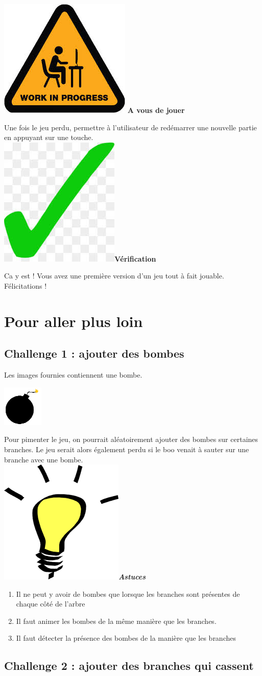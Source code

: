 \documentclass[french]{article}
\newcommand{\tips}{\includegraphics[scale=0.08]{tips}\textbf{\textit{Astuces\\}}}
\newcommand{\todo}{\includegraphics[scale=0.1]{work_in_progress}\textbf{ A vous de jouer\\} }
\newcommand{\result}{\includegraphics[scale=0.1]{green_tick}\textbf{Vérification\\}}
\begin{document}
\todo

Une fois le jeu perdu, permettre à l'utilisateur de redémarrer une nouvelle partie en appuyant sur une touche.\\

\result

Ca y est ! Vous avez une première version d'un jeu tout à fait jouable. Félicitations ! 

\section{Pour aller plus loin}

\subsection{Challenge 1 : ajouter des bombes}

Les images fournies contiennent une bombe. 

\begin{center}
	\includegraphics[scale=2]{bomb}
\end{center}

Pour pimenter le jeu, on pourrait aléatoirement ajouter des bombes sur certaines branches. Le jeu serait alors également perdu si le boo venait à sauter sur une branche avec une bombe.\\

\tips

\begin{enumerate}
	
	\item Il ne peut y avoir de bombes que lorsque les branches sont présentes de chaque côté de l'arbre\\
	
	\item Il faut animer les bombes de la même manière que les branches.\\
	
	\item Il faut détecter la présence des bombes de la manière que les branches\\
	
\end{enumerate}	

\subsection{Challenge 2 : ajouter des branches qui cassent}
\end{document}
